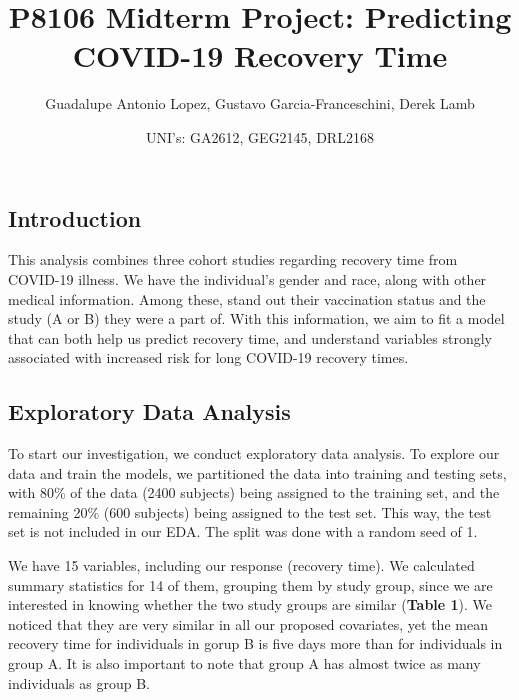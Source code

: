 \documentclass[
]{article}
\title{P8106 Midterm Project: Predicting COVID-19 Recovery Time}
\author{Guadalupe Antonio Lopez, Gustavo Garcia-Franceschini, Derek
Lamb \and UNI's: GA2612, GEG2145, DRL2168}
\date{}
\begin{document}
\maketitle

\hypertarget{introduction}{%
\subsection{Introduction}\label{introduction}}

This analysis combines three cohort studies regarding recovery time from
COVID-19 illness. We have the individual's gender and race, along with
other medical information. Among these, stand out their vaccination
status and the study (A or B) they were a part of. With this
information, we aim to fit a model that can both help us predict
recovery time, and understand variables strongly associated with
increased risk for long COVID-19 recovery times.

\hypertarget{exploratory-data-analysis}{%
\subsection{Exploratory Data Analysis}\label{exploratory-data-analysis}}

To start our investigation, we conduct exploratory data analysis. To
explore our data and train the models, we partitioned the data into
training and testing sets, with 80\% of the data (2400 subjects) being
assigned to the training set, and the remaining 20\% (600 subjects)
being assigned to the test set. This way, the test set is not included
in our EDA. The split was done with a random seed of 1.

We have 15 variables, including our response (recovery time). We
calculated summary statistics for 14 of them, grouping them by study
group, since we are interested in knowing whether the two study groups
are similar (\textbf{Table 1}). We noticed that they are very similar in
all our proposed covariates, yet the mean recovery time for individuals
in gorup B is five days more than for individuals in group A. It is also
important to note that group A has almost twice as many individuals as
group B.
\end{document}
